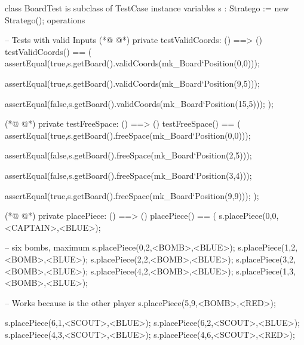 \begin{vdmpp}[breaklines=true]
class BoardTest is subclass of TestCase
        instance variables
                s : Stratego := new Stratego();
        operations          
        
            -- Tests with valid Inputs
(*@
\label{testValidCoords:7}
@*)
                private testValidCoords: () ==> ()
                testValidCoords() ==
                (
                        assertEqual(true,s.getBoard().validCoords(mk_Board`Position(0,0)));
                        
                        assertEqual(true,s.getBoard().validCoords(mk_Board`Position(9,5)));
                        
                        assertEqual(false,s.getBoard().validCoords(mk_Board`Position(15,5)));
                );
                
(*@
\label{testFreeSpace:17}
@*)
                private testFreeSpace: () ==> ()
                testFreeSpace() ==
                (
                        assertEqual(true,s.getBoard().freeSpace(mk_Board`Position(0,0)));
                        
                        assertEqual(false,s.getBoard().freeSpace(mk_Board`Position(2,5)));
                        
                        assertEqual(false,s.getBoard().freeSpace(mk_Board`Position(3,4)));
                        
                        assertEqual(true,s.getBoard().freeSpace(mk_Board`Position(9,9)));
                );
                
(*@
\label{placePiece:29}
@*)
                private placePiece: () ==> ()
                placePiece() ==
                (
                    s.placePiece(0,0,<CAPTAIN>,<BLUE>);
                    
                    -- six bombs, maximum
                    s.placePiece(0,2,<BOMB>,<BLUE>);
                    s.placePiece(1,2,<BOMB>,<BLUE>);
                    s.placePiece(2,2,<BOMB>,<BLUE>);
                    s.placePiece(3,2,<BOMB>,<BLUE>);
                    s.placePiece(4,2,<BOMB>,<BLUE>);
                    s.placePiece(1,3,<BOMB>,<BLUE>);
                    
                    -- Works because is the other player
                    s.placePiece(5,9,<BOMB>,<RED>);
                    
          
                    s.placePiece(6,1,<SCOUT>,<BLUE>);
                    s.placePiece(6,2,<SCOUT>,<BLUE>);
                    s.placePiece(4,3,<SCOUT>,<BLUE>);
                    s.placePiece(4,6,<SCOUT>,<RED>);
                    

\end{vdmpp}
